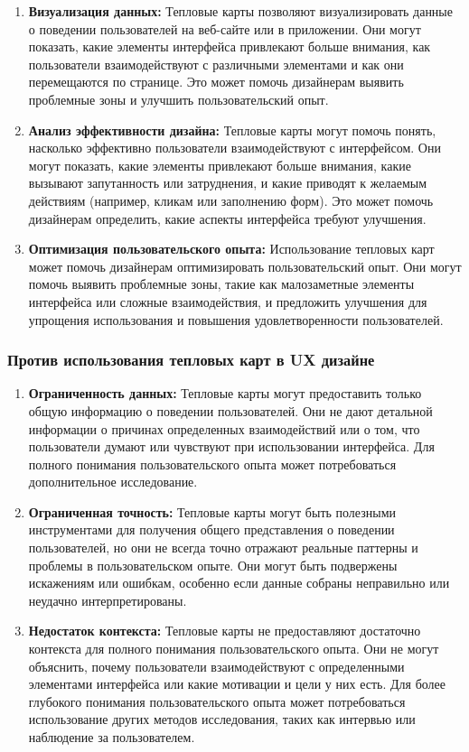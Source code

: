 \documentclass{article}
\begin{document}
\begin{enumerate}
    \item \textbf{Визуализация данных:} Тепловые карты позволяют визуализировать данные о поведении пользователей на веб-сайте или в приложении. Они могут показать, какие элементы интерфейса привлекают больше внимания, как пользователи взаимодействуют с различными элементами и как они перемещаются по странице. Это может помочь дизайнерам выявить проблемные зоны и улучшить пользовательский опыт.
    \item \textbf{Анализ эффективности дизайна:} Тепловые карты могут помочь понять, насколько эффективно пользователи взаимодействуют с интерфейсом. Они могут показать, какие элементы привлекают больше внимания, какие вызывают запутанность или затруднения, и какие приводят к желаемым действиям (например, кликам или заполнению форм). Это может помочь дизайнерам определить, какие аспекты интерфейса требуют улучшения.
    \item \textbf{Оптимизация пользовательского опыта:} Использование тепловых карт может помочь дизайнерам оптимизировать пользовательский опыт. Они могут помочь выявить проблемные зоны, такие как малозаметные элементы интерфейса или сложные взаимодействия, и предложить улучшения для упрощения использования и повышения удовлетворенности пользователей.
\end{enumerate} 

\subsubsection{Против использования тепловых карт в UX дизайне}

\begin{enumerate}
    \item \textbf{Ограниченность данных:} Тепловые карты могут предоставить только общую информацию о поведении пользователей. Они не дают детальной информации о причинах определенных взаимодействий или о том, что пользователи думают или чувствуют при использовании интерфейса. Для полного понимания пользовательского опыта может потребоваться дополнительное исследование.
    \item \textbf{Ограниченная точность:} Тепловые карты могут быть полезными инструментами для получения общего представления о поведении пользователей, но они не всегда точно отражают реальные паттерны и проблемы в пользовательском опыте. Они могут быть подвержены искажениям или ошибкам, особенно если данные собраны неправильно или неудачно интерпретированы.
    \item \textbf{Недостаток контекста:} Тепловые карты не предоставляют достаточно контекста для полного понимания пользовательского опыта. Они не могут объяснить, почему пользователи взаимодействуют с определенными элементами интерфейса или какие мотивации и цели у них есть. Для более глубокого понимания пользовательского опыта может потребоваться использование других методов исследования, таких как интервью или наблюдение за пользователем.
\end{enumerate}
\end{document}
